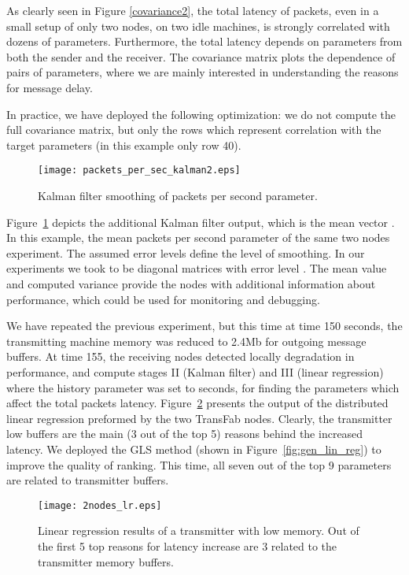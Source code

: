\documentclass[times, 10pt,twocolumn]{article}
\begin{document}
As clearly seen in Figure \ref{covariance2}, the total
latency of packets, even in a small setup of only two nodes,
on two idle machines, is strongly correlated with dozens of
parameters. Furthermore, the total latency depends on
parameters from both the sender and the receiver.
The covariance matrix plots the dependence of pairs of
parameters, where we are mainly interested in understanding
the reasons for message delay. 

In practice, we have deployed
the following optimization: we do not compute the full covariance matrix, but only the rows which represent correlation with the target parameters (in this example only row 40). 

\begin{figure}[ht!]
\begin{center}
\texttt{[image: packets\_per\_sec\_kalman2.eps]}\\
  \caption{Kalman filter smoothing of packets per second parameter.}\label{fig:packets_per_sec_kalman}
\end{center}
\end{figure}

Figure~\ref{fig:packets_per_sec_kalman} depicts the additional Kalman filter output, which is the mean vector .
In this example, the mean packets per second parameter of the same two nodes experiment.
The assumed error levels  define the level of smoothing. In our experiments we took  to be diagonal matrices with error level . The mean value and computed variance provide the nodes with additional
information about performance, which could be used for monitoring and debugging.


We have repeated the previous experiment, but this time at time 150 seconds, the transmitting machine memory was reduced to 2.4Mb for outgoing message buffers. At time 155, the receiving nodes detected locally degradation in performance, and compute stages II (Kalman filter) and III (linear regression) where the history parameter was set to  seconds, for finding the parameters which affect the total packets latency. Figure~\ref{fig:lin_reg} presents the output of the
distributed linear regression preformed by the two TransFab nodes. Clearly, the transmitter low buffers are the main (3 out of the top 5) reasons behind the increased latency. We deployed the GLS method (shown in Figure~\ref{fig:gen_lin_reg}) to improve the quality of ranking. This time, all seven out of the top 9 parameters are related to transmitter buffers.

\begin{figure}[ht!]
\begin{center}
\texttt{[image: 2nodes\_lr.eps]}\\
  \caption{Linear regression results of a transmitter with low memory. Out of the first 5 top reasons for latency increase are 3 related to the transmitter memory buffers.}
\label{fig:lin_reg}
\end{center}
\end{figure}
\end{document}
